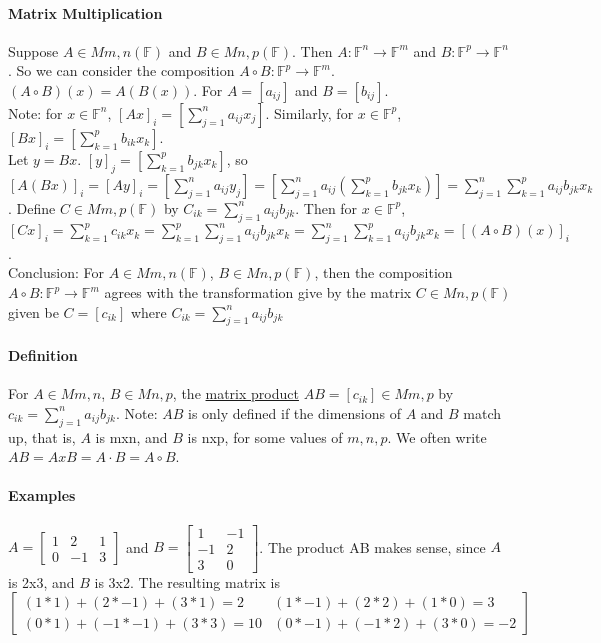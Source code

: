 \documentclass[10pt,letter]{article}
\begin{document}
\paragraph{Matrix Multiplication}
Suppose $A\in Mm,n(\mathbb{F})$ and $B\in Mn,p(\mathbb{F})$. Then $A:\mathbb{F}^n\rightarrow\mathbb{F}^m$ and $B:\mathbb{F}^p\rightarrow\mathbb{F}^n$. So we can consider the composition $A\circ B:\mathbb{F}^p\rightarrow\mathbb{F}^m$. $(A\circ B)(x)=A(B(x))$. For $A=[a_{ij}]$ and $B=[b_{ij}]$. \\ 
Note: for $x\in\mathbb{F}^n$, $[Ax]_i=[\sum_{j=1}^na_{ij}x_j]$. Similarly, for $x\in\mathbb{F}^p$, $[Bx]_i=[\sum_{k=1}^{p}b_{ik}x_k]$. \\ 
Let $y=Bx$. $[y]_j=[\sum_{k=1}^{p}b_{jk}x_{k}]$, so $[A(Bx)]_i=[Ay]_i=[\sum_{j=1}^{n}a_{ij}y_{j}]=[\sum_{j=1}^na_{ij}(\sum_{k=1}^pb_{jk}x_k)]=\sum_{j=1}^{n}\sum_{k=1}^pa_{ij}b_{jk}x_k$. Define $C\in Mm,p(\mathbb{F})$ by $C_{ik}=\sum_{j=1}^{n}a_{ij}b_{jk}$. Then for $x\in\mathbb{F}^p$, $[Cx]_i=\sum_{k=1}^pc_{ik}x_k=\sum_{k=1}^{p}\sum_{j=1}^{n}a_{ij}b_{jk}x_k=\sum_{j=1}^n\sum_{k=1}^pa_{ij}b_{jk}x_k=[(A\circ B)(x)]_i$. \\ 
Conclusion: For $A\in Mm,n(\mathbb{F})$, $B\in Mn,p(\mathbb{F})$, then the composition $A\circ B: \mathbb{F}^p\rightarrow\mathbb{F}^m$ agrees with the transformation give by the matrix $C\in Mn,p(\mathbb{F})$ given be $C=[c_{ik}]$ where $C_{ik}=\sum_{j=1}^{n}a_{ij}b_{jk}$

\paragraph{Definition}
For $A\in Mm,n$, $B\in Mn,p$, the \underline{matrix product} $AB=[c_{ik}]\in Mm,p$ by $c_{ik}=\sum_{j=1}^na_{ij}b_{jk}$. Note: $AB$ is only defined if the dimensions of $A$ and $B$ match up, that is, $A$ is mxn, and $B$ is nxp, for some values of $m,n,p$. We often write $AB=AxB=A\cdot B=A\circ B$. 

\paragraph{Examples}
$A = \begin{bmatrix} 1 & 2 & 1 \\ 0 & -1 & 3 \end{bmatrix}$ and $B = \begin{bmatrix} 1 & -1 \\ -1 & 2 \\ 3 & 0\end{bmatrix}$. The product AB makes sense, since $A$ is 2x3, and $B$ is 3x2. The resulting matrix is $\begin{bmatrix}(1*1)+(2*-1)+(3*1)=2 & (1*-1)+(2*2)+(1*0)=3 \\ (0*1)+(-1*-1)+(3*3)= 10 & (0*-1)+(-1*2)+(3*0)=-2 \end{bmatrix}$ \\ \\ 
\end{document}
